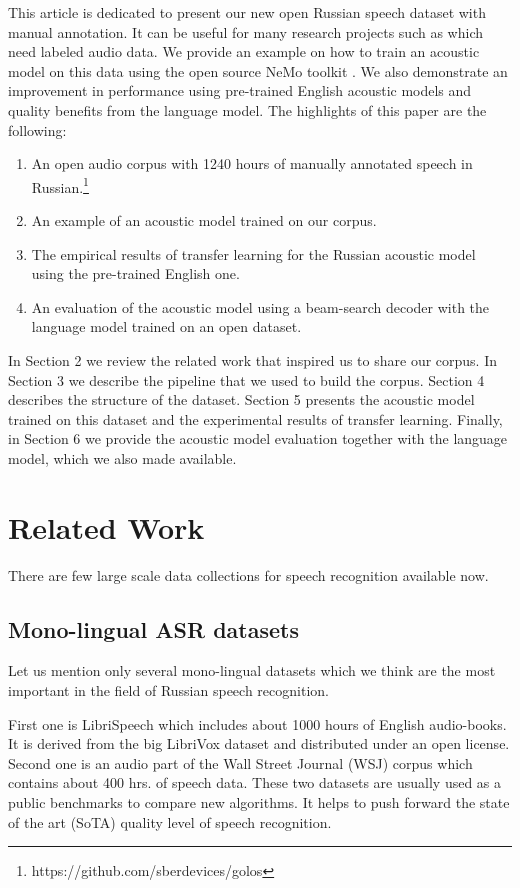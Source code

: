 \documentclass[a4paper]{article}
\begin{document}
This article is dedicated to present our new open Russian speech dataset with manual annotation. It can be useful for many research projects such as \cite{savchenko2008analyse, gubochkin2013cl} which need labeled audio data. We provide an example on how to train an acoustic model on this data using the open source NeMo toolkit \cite{kuchaiev2019nemo}. We also demonstrate an improvement in performance using pre-trained English acoustic models and quality benefits from the language model. The highlights of this paper are the following:
\begin{enumerate}
\item An open audio corpus with 1240 hours of manually annotated speech in Russian.\footnote{https://github.com/sberdevices/golos}
\item An example of an acoustic model trained on our corpus.
\item The empirical results of transfer learning for the Russian acoustic model using the pre-trained English one.
\item An evaluation of the acoustic model using a beam-search decoder with the language model trained on an open dataset.
\end{enumerate}


In Section 2 we review the related work that inspired us to share our corpus. In Section 3 we describe the pipeline that we used to build the corpus. Section 4 describes the structure of the dataset. Section 5 presents the acoustic model trained on this dataset and the experimental results of transfer learning. Finally, in Section 6 we provide the acoustic model evaluation together with the language model, which we also made available.

\section{Related Work}

There are few large scale data collections for speech recognition available now. 

\subsection{Mono-lingual ASR datasets}

Let us mention only several mono-lingual datasets which we think are the most important in the field of Russian speech recognition.

First one is LibriSpeech \cite{panayotov2015librispeech} which includes about 1000 hours of English audio-books. It is derived from the big LibriVox dataset and distributed under an open license. Second one is an audio part of the Wall Street Journal (WSJ) corpus \cite{paul1992design} which contains about 400 hrs. of speech data. These two datasets are usually used as a public benchmarks to compare new algorithms. It helps to push forward the state of the art (SoTA) quality level of speech recognition.
\end{document}
